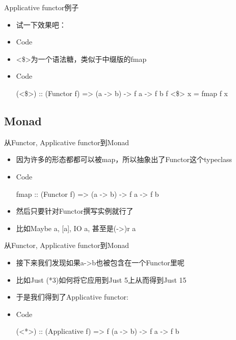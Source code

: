 \documentclass[xcolor=dvipsnames, 11pt]{beamer}
\newenvironment{code}{\begin{block}{Code}\begin{semiverbatim} \begin{footnotesize}}{\end{footnotesize}\end{semiverbatim}\end{block}}
\newenvironment{iit}{\begin{itemize}\setlength{\itemsep}{0.2cm}}{\end{itemize}}
\begin{document}
\begin{frame}[fragile]{Applicative functor例子}
\begin{iit}
\item<2->试一下效果吧：
\item<3->[]\begin{code}
\end{code}
\item<6-><\$>为一个语法糖，类似于中缀版的fmap
\item<7->[]\begin{code}
(<\$>) :: (Functor f) => (a -> b) -> f a -> f b   
f <\$> x = fmap f x
\end{code}
\end{iit}
\end{frame}

\subsection{Monad}
\begin{frame}[fragile]{从Functor, Applicative functor到Monad}
\begin{iit}
\item<2->因为许多的形态都都可以被map，所以抽象出了Functor这个typeclass
\item<3->[]\begin{code}
fmap :: (Functor f) => (a -> b) -> f a -> f b
\end{code}
\item<4->然后只要针对Functor撰写实例就行了
\item<5->比如Maybe a, [a], IO a, 甚至是(->)r a
\end{iit}
\end{frame}

\begin{frame}[fragile]{从Functor, Applicative functor到Monad}
\begin{iit}
\item<2->接下来我们发现如果a->b也被包含在一个Functor里呢
\item<3->比如Just (*3)如何将它应用到Just 5上从而得到Just 15
\item<4->于是我们得到了Applicative functor:
\item<5->[]\begin{code}
(<*>) :: (Applicative f) => f (a -> b) -> f a -> f b
\end{code}
\end{iit}
\end{frame}
\end{document}
